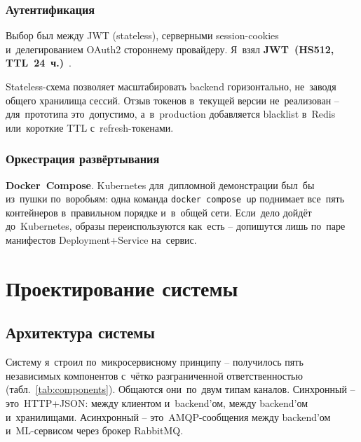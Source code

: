 \documentclass[a4paper,12pt]{diplom}
\begin{document}
\subsection{Аутентификация}

Выбор был между JWT (stateless), серверными session-cookies и~делегированием OAuth2 стороннему провайдеру. Я~взял \textbf{JWT~(HS512, TTL~24~ч.)}~\cite{RFC7519}.

Stateless-схема позволяет масштабировать backend горизонтально, не~заводя общего хранилища сессий. Отзыв токенов в~текущей версии не~реализован -- для~прототипа это~допустимо, а~в~production добавляется blacklist в~Redis или~короткие TTL с~refresh-токенами.

\subsection{Оркестрация развёртывания}

\textbf{Docker~Compose}. Kubernetes для~дипломной демонстрации был~бы из~пушки по~воробьям: одна команда \texttt{docker compose up} поднимает все~пять контейнеров в~правильном порядке и~в~общей сети. Если~дело дойдёт до~Kubernetes, образы переиспользуются как~есть -- допишутся лишь по~паре манифестов Deployment+Service на~сервис.

\chapter{Проектирование системы}
\label{ch:design}

\section{Архитектура системы}
\label{sec:architecture}

Систему я~строил по~микросервисному принципу -- получилось пять независимых компонентов с~чётко разграниченной ответственностью (табл.~\ref{tab:components}). Общаются они~по~двум типам каналов. Синхронный -- это~HTTP+JSON: между клиентом и~backend'ом, между backend'ом и~хранилищами. Асинхронный -- это~AMQP-сообщения между backend'ом и~ML-сервисом через брокер RabbitMQ.
\end{document}
